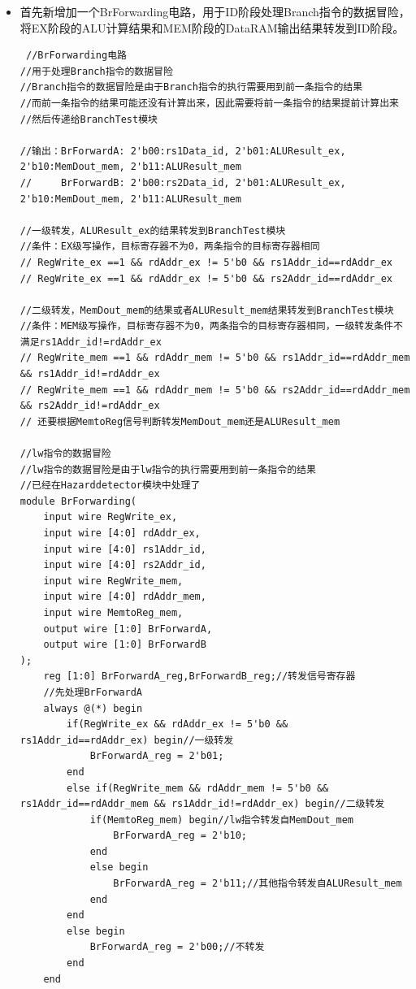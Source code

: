 \documentclass[12pt,hyperref,a4paper,UTF8]{ctexart}
\begin{document}
\begin{itemize}
    \item 首先新增加一个BrForwarding电路，用于ID阶段处理Branch指令的数据冒险，将EX阶段的ALU计算结果和MEM阶段的DataRAM输出结果转发到ID阶段。
    \begin{lstlisting}
 //BrForwarding电路
//用于处理Branch指令的数据冒险
//Branch指令的数据冒险是由于Branch指令的执行需要用到前一条指令的结果
//而前一条指令的结果可能还没有计算出来，因此需要将前一条指令的结果提前计算出来
//然后传递给BranchTest模块

//输出：BrForwardA: 2'b00:rs1Data_id, 2'b01:ALUResult_ex, 2'b10:MemDout_mem, 2'b11:ALUResult_mem
//     BrForwardB: 2'b00:rs2Data_id, 2'b01:ALUResult_ex, 2'b10:MemDout_mem, 2'b11:ALUResult_mem

//一级转发，ALUResult_ex的结果转发到BranchTest模块
//条件：EX级写操作，目标寄存器不为0，两条指令的目标寄存器相同
// RegWrite_ex ==1 && rdAddr_ex != 5'b0 && rs1Addr_id==rdAddr_ex
// RegWrite_ex ==1 && rdAddr_ex != 5'b0 && rs2Addr_id==rdAddr_ex

//二级转发，MemDout_mem的结果或者ALUResult_mem结果转发到BranchTest模块
//条件：MEM级写操作，目标寄存器不为0，两条指令的目标寄存器相同，一级转发条件不满足rs1Addr_id!=rdAddr_ex
// RegWrite_mem ==1 && rdAddr_mem != 5'b0 && rs1Addr_id==rdAddr_mem && rs1Addr_id!=rdAddr_ex
// RegWrite_mem ==1 && rdAddr_mem != 5'b0 && rs2Addr_id==rdAddr_mem && rs2Addr_id!=rdAddr_ex
// 还要根据MemtoReg信号判断转发MemDout_mem还是ALUResult_mem

//lw指令的数据冒险
//lw指令的数据冒险是由于lw指令的执行需要用到前一条指令的结果
//已经在Hazarddetector模块中处理了
module BrForwarding(
    input wire RegWrite_ex,
    input wire [4:0] rdAddr_ex,
    input wire [4:0] rs1Addr_id,
    input wire [4:0] rs2Addr_id,
    input wire RegWrite_mem,
    input wire [4:0] rdAddr_mem,
    input wire MemtoReg_mem,
    output wire [1:0] BrForwardA,
    output wire [1:0] BrForwardB
);
    reg [1:0] BrForwardA_reg,BrForwardB_reg;//转发信号寄存器
    //先处理BrForwardA
    always @(*) begin
        if(RegWrite_ex && rdAddr_ex != 5'b0 && rs1Addr_id==rdAddr_ex) begin//一级转发
            BrForwardA_reg = 2'b01;
        end
        else if(RegWrite_mem && rdAddr_mem != 5'b0 && rs1Addr_id==rdAddr_mem && rs1Addr_id!=rdAddr_ex) begin//二级转发
            if(MemtoReg_mem) begin//lw指令转发自MemDout_mem
                BrForwardA_reg = 2'b10;
            end
            else begin
                BrForwardA_reg = 2'b11;//其他指令转发自ALUResult_mem
            end
        end
        else begin
            BrForwardA_reg = 2'b00;//不转发
        end
    end


\end{lstlisting}
\end{itemize}
\end{document}
